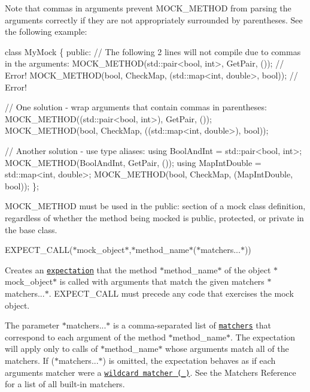 Note that commas in arguments prevent {\ttfamily M\+O\+C\+K\+\_\+\+M\+E\+T\+H\+OD} from parsing the arguments correctly if they are not appropriately surrounded by parentheses. See the following example\+:


\begin{DoxyCode}
\textcolor{keyword}{class }MyMock \{
 \textcolor{keyword}{public}:
  \textcolor{comment}{// The following 2 lines will not compile due to commas in the arguments:}
  MOCK\_METHOD(std::pair<bool, int>, GetPair, ());              \textcolor{comment}{// Error!}
  MOCK\_METHOD(\textcolor{keywordtype}{bool}, CheckMap, (std::map<int, double>, \textcolor{keywordtype}{bool}));  \textcolor{comment}{// Error!}

  \textcolor{comment}{// One solution - wrap arguments that contain commas in parentheses:}
  MOCK\_METHOD((std::pair<bool, int>), GetPair, ());
  MOCK\_METHOD(\textcolor{keywordtype}{bool}, CheckMap, ((std::map<int, double>), \textcolor{keywordtype}{bool}));

  \textcolor{comment}{// Another solution - use type aliases:}
  \textcolor{keyword}{using} BoolAndInt = std::pair<bool, int>;
  MOCK\_METHOD(BoolAndInt, GetPair, ());
  \textcolor{keyword}{using} MapIntDouble = std::map<int, double>;
  MOCK\_METHOD(\textcolor{keywordtype}{bool}, CheckMap, (MapIntDouble, \textcolor{keywordtype}{bool}));
\};
\end{DoxyCode}


{\ttfamily M\+O\+C\+K\+\_\+\+M\+E\+T\+H\+OD} must be used in the {\ttfamily public\+:} section of a mock class definition, regardless of whether the method being mocked is {\ttfamily public}, {\ttfamily protected}, or {\ttfamily private} in the base class.

{\ttfamily E\+X\+P\+E\+C\+T\+\_\+\+C\+A\+LL(}$\ast${\ttfamily mock\+\_\+object}$\ast${\ttfamily ,}$\ast${\ttfamily method\+\_\+name}$\ast${\ttfamily (}$\ast${\ttfamily matchers...}$\ast${\ttfamily ))}

Creates an \href{../gmock_for_dummies.md#setting-expectations}{\tt expectation} that the method $\ast${\ttfamily method\+\_\+name}$\ast$ of the object $\ast${\ttfamily mock\+\_\+object}$\ast$ is called with arguments that match the given matchers $\ast${\ttfamily matchers...}$\ast$. {\ttfamily E\+X\+P\+E\+C\+T\+\_\+\+C\+A\+LL} must precede any code that exercises the mock object.

The parameter $\ast${\ttfamily matchers...}$\ast$ is a comma-\/separated list of \href{../gmock_for_dummies.md#matchers-what-arguments-do-we-expect}{\tt matchers} that correspond to each argument of the method $\ast${\ttfamily method\+\_\+name}$\ast$. The expectation will apply only to calls of $\ast${\ttfamily method\+\_\+name}$\ast$ whose arguments match all of the matchers. If {\ttfamily (}$\ast${\ttfamily matchers...}$\ast${\ttfamily )} is omitted, the expectation behaves as if each argument\textquotesingle{}s matcher were a \href{matchers.md#wildcard}{\tt wildcard matcher ({\ttfamily \+\_\+})}. See the Matchers Reference for a list of all built-\/in matchers.

